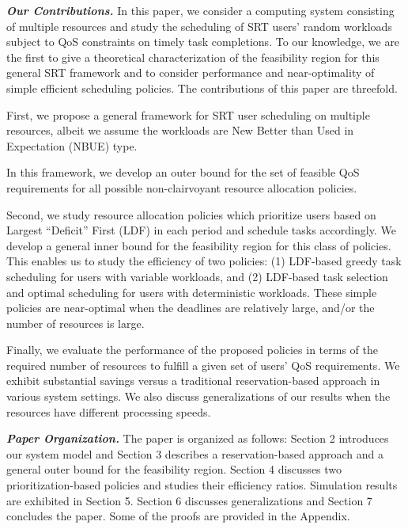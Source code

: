 \documentclass[prodmode,acmtompecs]{acmsmall}
\newcommand{\myComments}[1]{}
\newif\ifdissertation
\newcommand{\dissertationStart}{\ifdissertation  \myComments{Dissertation version: }}
\newcommand{\commentEnd}{\myComments{End}}
\begin{document}
{\bf \em Our Contributions. }
In this paper, we consider a computing system consisting of multiple resources and study the scheduling of SRT users' random workloads subject to QoS constraints on timely task completions. To our knowledge, we are the first to give a theoretical 
characterization of the feasibility region for this general SRT framework and to consider performance and near-optimality of simple efficient scheduling policies. 
The contributions of this paper are threefold. 

First, we propose a general framework for SRT user scheduling on multiple resources, albeit we assume the workloads are New Better than Used in Expectation (NBUE) type. 
\dissertationStart
The authors believe it is a novel contribution to look at NBUE random workloads that characterize many workload distributions of interest and lead to nice results. 
\commentEnd\fi
In this framework, we develop an outer bound for the set of feasible QoS requirements for all possible non-clairvoyant resource allocation policies. 

Second, we study resource allocation policies which prioritize users based on Largest ``Deficit'' First (LDF) in each period and schedule tasks accordingly. We develop a general inner bound for the feasibility region for this class of policies. 
This enables us to study the efficiency of two policies: (1) LDF-based greedy task scheduling for users with variable workloads, and (2) LDF-based task selection and optimal scheduling for users with deterministic workloads. 
These simple policies are near-optimal when the deadlines are relatively large, and/or the number of resources is large. 


Finally, we evaluate the performance of the proposed policies in terms of the required number of resources to fulfill a given set of users' QoS requirements. 
We exhibit substantial savings versus a traditional reservation-based approach in various system settings. 
We also discuss generalizations of our results when the resources have different processing speeds. 

{\bf \em Paper Organization. }
The paper is organized as follows: Section 2 introduces our system model and Section 3 describes a reservation-based approach and a general outer bound for the feasibility region. Section 4 discusses two prioritization-based policies and studies their efficiency ratios. Simulation results are exhibited in Section 5. Section 6 discusses generalizations and Section 7 concludes the paper. Some of the proofs are provided in the Appendix.
\end{document}

